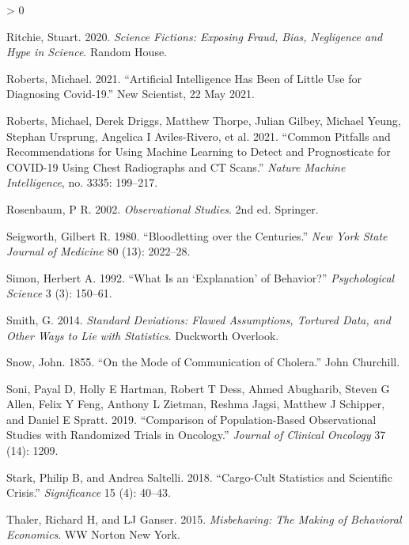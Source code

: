\documentclass[
  10pt,
  b5paper]{book}
\newlength{\cslhangindent}
\newenvironment{CSLReferences}[2] %
 {%
  \setlength{\parindent}{0pt}
  \ifodd #1 \everypar{\setlength{\hangindent}{\cslhangindent}}\ignorespaces\fi
  \ifnum #2 > 0
  \setlength{\parskip}{#2\baselineskip}
  \fi
 }%
 {}
\begin{document}
\begin{CSLReferences}{1}{0}
\leavevmode\hypertarget{ref-ritchie2020science}{}%
Ritchie, Stuart. 2020. \emph{Science Fictions: Exposing Fraud, Bias, Negligence and Hype in Science}. Random House.

\leavevmode\hypertarget{ref-roberts2021AIcovid19}{}%
Roberts, Michael. 2021. {``Artificial Intelligence Has Been of Little Use for Diagnosing Covid-19.''} New Scientist, 22 May 2021.

\leavevmode\hypertarget{ref-roberts2021common}{}%
Roberts, Michael, Derek Driggs, Matthew Thorpe, Julian Gilbey, Michael Yeung, Stephan Ursprung, Angelica I Aviles-Rivero, et al. 2021. {``Common Pitfalls and Recommendations for Using Machine Learning to Detect and Prognosticate for COVID-19 Using Chest Radiographs and CT Scans.''} \emph{Nature Machine Intelligence}, no. 3335: 199--217.

\leavevmode\hypertarget{ref-RosBook}{}%
Rosenbaum, P R. 2002. \emph{Observational Studies}. 2nd ed. Springer.

\leavevmode\hypertarget{ref-seigworth1980bloodletting}{}%
Seigworth, Gilbert R. 1980. {``Bloodletting over the Centuries.''} \emph{New York State Journal of Medicine} 80 (13): 2022--28.

\leavevmode\hypertarget{ref-simon1992explanation}{}%
Simon, Herbert A. 1992. {``What Is an {`Explanation'} of Behavior?''} \emph{Psychological Science} 3 (3): 150--61.

\leavevmode\hypertarget{ref-smith-sd}{}%
Smith, G. 2014. \emph{Standard Deviations: Flawed Assumptions, Tortured Data, and Other Ways to Lie with Statistics}. Duckworth Overlook.

\leavevmode\hypertarget{ref-snow1849mode}{}%
Snow, John. 1855. {``On the Mode of Communication of Cholera.''} John Churchill.

\leavevmode\hypertarget{ref-soni2019comparison}{}%
Soni, Payal D, Holly E Hartman, Robert T Dess, Ahmed Abugharib, Steven G Allen, Felix Y Feng, Anthony L Zietman, Reshma Jagsi, Matthew J Schipper, and Daniel E Spratt. 2019. {``Comparison of Population-Based Observational Studies with Randomized Trials in Oncology.''} \emph{Journal of Clinical Oncology} 37 (14): 1209.

\leavevmode\hypertarget{ref-stark2018cargo}{}%
Stark, Philip B, and Andrea Saltelli. 2018. {``Cargo-Cult Statistics and Scientific Crisis.''} \emph{Significance} 15 (4): 40--43.

\leavevmode\hypertarget{ref-thaler2015misbehaving}{}%
Thaler, Richard H, and LJ Ganser. 2015. \emph{Misbehaving: The Making of Behavioral Economics}. WW Norton New York.


\end{CSLReferences}
\end{document}
